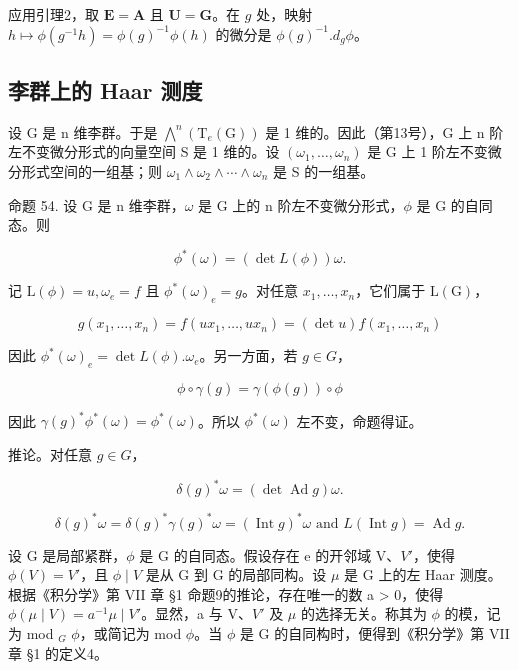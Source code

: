 应用引理2，取 \(\mathbf{E} = \mathbf{A}\) 且 \(\mathbf{U} = \mathbf{G}\)。在 \(g\) 处，映射 \(h \mapsto \phi(g^{-1}h) = \phi(g)^{-1}\phi(h)\) 的微分是 \(\phi(g)^{-1}.d_g\phi\)。

\subsection{李群上的 Haar 测度}

设 G 是 n 维李群。于是 \(\bigwedge^{n}(\mathrm{T}_{e}(\mathrm{G}))\) 是 1 维的。因此（第13号），G 上 n 阶左不变微分形式的向量空间 S 是 1 维的。设 \((\omega_{1},\ldots,\omega_{n})\) 是 G 上 1 阶左不变微分形式空间的一组基；则 \(\omega_{1}\wedge\omega_{2}\wedge\cdots\wedge\omega_{n}\) 是 S 的一组基。

命题 54. 设 G 是 n 维李群，\(\omega\) 是 G 上的 n 阶左不变微分形式，\(\phi\) 是 G 的自同态。则

\[
\phi^ {*} (\omega) = (\det L (\phi)) \omega .
\]

记 \(\mathrm{L}(\phi) = u, \omega_e = f\) 且 \(\phi^*(\omega)_e = g\)。对任意 \(x_1, \ldots, x_n\)，它们属于 \(\mathrm{L}(\mathrm{G})\)，

\[
g (x _ {1}, \dots , x _ {n}) = f (u x _ {1}, \dots , u x _ {n}) = (\det u) f (x _ {1}, \dots , x _ {n})
\]

因此 \(\phi^{*}(\omega)_{e} = \det L(\phi). \omega_{e}\)。另一方面，若 \(g \in G\)，

\[
\phi \circ \gamma (g) = \gamma (\phi (g)) \circ \phi
\]

因此 \(\gamma(g)^{*}\phi^{*}(\omega)=\phi^{*}(\omega)\)。所以 \(\phi^{*}(\omega)\) 左不变，命题得证。

推论。对任意 \(g \in G\)，

\[
\delta (g) ^ {*} \omega = (\det \operatorname{Ad} g) \omega .
\]

\[
\delta (g) ^ {*} \omega = \delta (g) ^ {*} \gamma (g) ^ {*} \omega = (\operatorname{Int} g) ^ {*} \omega \text {   and   } L (\operatorname{Int} g) = \operatorname{Ad} g.
\]

设 G 是局部紧群，\(\phi\) 是 G 的自同态。假设存在 e 的开邻域 V、\(V'\)，使得 \(\phi(V) = V'\)，且 \(\phi \mid V\) 是从 G 到 G 的局部同构。设 \(\mu\) 是 G 上的左 Haar 测度。根据《积分学》第 VII 章 §1 命题9的推论，存在唯一的数 a \textgreater{} 0，使得 \(\phi(\mu \mid V) = a^{-1}\mu \mid V'\)。显然，a 与 V、\(V'\) 及 \(\mu\) 的选择无关。称其为 \(\phi\) 的模，记为 mod \(_{G}\) \(\phi\)，或简记为 mod \(\phi\)。当 \(\phi\) 是 G 的自同构时，便得到《积分学》第 VII 章 §1 的定义4。


